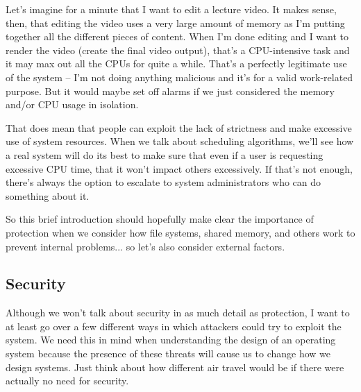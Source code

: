 Let's imagine for a minute that I want to edit a lecture video. It makes sense, then, that editing the video uses a very large amount of memory as I'm putting together all the different pieces of content. When I'm done editing and I want to render the video (create the final video output), that's a CPU-intensive task and it may max out all the CPUs for quite a while. That's a perfectly legitimate use of the system -- I'm not doing anything malicious and it's for a valid work-related purpose. But it would maybe set off alarms if we just considered the memory and/or CPU usage in isolation.

That does mean that people can exploit the lack of strictness and make excessive use of system resources. When we talk about scheduling algorithms, we'll see how a real system will do its best to make sure that even if a user is requesting excessive CPU time, that it won't impact others excessively. If that's not enough, there's always the option to escalate to system administrators who can do something about it.

So this brief introduction should hopefully make clear the importance of protection when we consider how file systems, shared memory, and others work to prevent internal problems... so let's also consider external factors.

\subsection*{Security}
Although we won't talk about security in as much detail as protection, I want to at least go over a few different ways in which attackers could try to exploit the system. We need this in mind when understanding the design of an operating system because the presence of these threats will cause us to change how we design systems. Just think about how different air travel would be if there were actually no need for security. 

